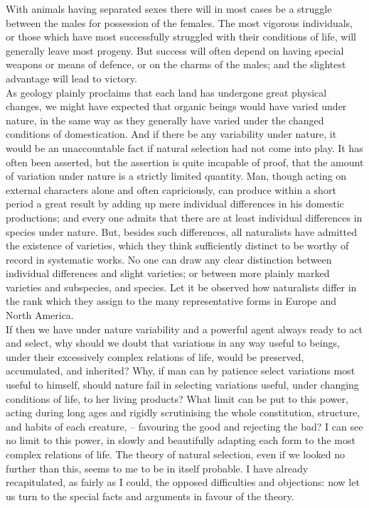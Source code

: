 \indent With animals having separated sexes there will in most cases be a struggle between the males for possession of the females. The most vigorous individuals, or those which have most successfully struggled with their conditions of life, will generally leave most progeny. But success will often depend on having special weapons or means of defence, or on the charms of the males; and the slightest advantage will lead to victory.~\\
\indent As geology plainly proclaims that each land has undergone great physical changes, we might have expected that organic beings would have varied under nature, in the same way as they generally have varied under the changed conditions of domestication. And if there be any variability under nature, it would be an unaccountable fact if natural selection had not come into play. It has often been asserted, but the assertion is quite incapable of proof, that the amount of variation under nature is a strictly limited quantity. Man, though acting on external characters alone and often capriciously, can produce within a short period a great result by adding up mere individual differences in his domestic productions; and every one admits that there are at least individual differences in species under nature.  But, besides such differences, all naturalists have admitted the existence of varieties, which they think sufficiently distinct to be worthy of record in systematic works. No one can draw any clear distinction between individual differences and slight varieties; or between more plainly marked varieties and subspecies, and species. Let it be observed how naturalists differ in the rank which they assign to the many representative forms in Europe and North America.~\\
\indent If then we have under nature variability and a powerful agent always ready to act and select, why should we doubt that variations in any way useful to beings, under their excessively complex relations of life, would be preserved, accumulated, and inherited? Why, if man can by patience select variations most useful to himself, should nature fail in selecting variations useful, under changing conditions of life, to her living products? What limit can be put to this power, acting during long ages and rigidly scrutinising the whole constitution, structure, and habits of each creature, -- favouring the good and rejecting the bad? I can see no limit to this power, in slowly and beautifully adapting each form to the most complex relations of life. The theory of natural selection, even if we looked no further than this, seems to me to be in itself probable. I have already recapitulated, as fairly as I could, the opposed difficulties and objections: now let us turn to the special facts and arguments in favour of the theory.~\\
